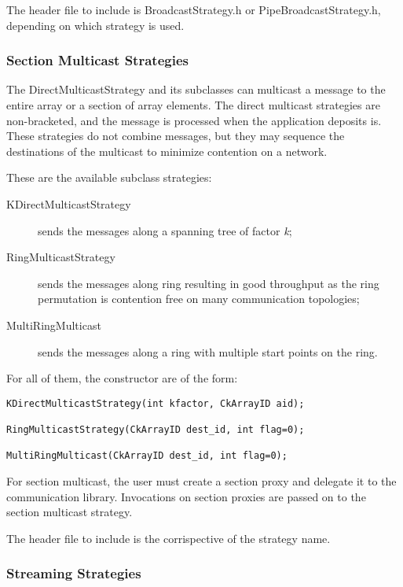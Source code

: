 {The header file to include is {\textrm{BroadcastStrategy.h}} or
{\textrm{PipeBroadcastStrategy.h}}, depending on which strategy is used.

\subsubsection{Section Multicast Strategies}

The DirectMulticastStrategy and its subclasses can multicast a message to the entire
array or a section of array elements. The direct multicast strategies
are non-bracketed, and the message is processed when the application
deposits is. These strategies do not combine messages, but they may
sequence the destinations of the multicast to minimize contention on a
network.

These are the available subclass strategies:

\begin{description}
\item[KDirectMulticastStrategy] sends the messages along a spanning tree of factor {\em k};
\item[RingMulticastStrategy] sends the messages along ring resulting in good throughput as the ring permutation is contention free on many communication topologies;
\item[MultiRingMulticast] sends the messages along a ring with multiple start points on the ring.
\end{description}

For all of them, the constructor are of the form:

\begin{verbatim}
KDirectMulticastStrategy(int kfactor, CkArrayID aid);

RingMulticastStrategy(CkArrayID dest_id, int flag=0);

MultiRingMulticast(CkArrayID dest_id, int flag=0);
\end{verbatim}

For section multicast, the user must create a section proxy and delegate it to
the communication library. Invocations on section proxies are passed on to the
section multicast strategy.

The header file to include is the corrispective of the strategy name.

\subsubsection{Streaming Strategies}

}
